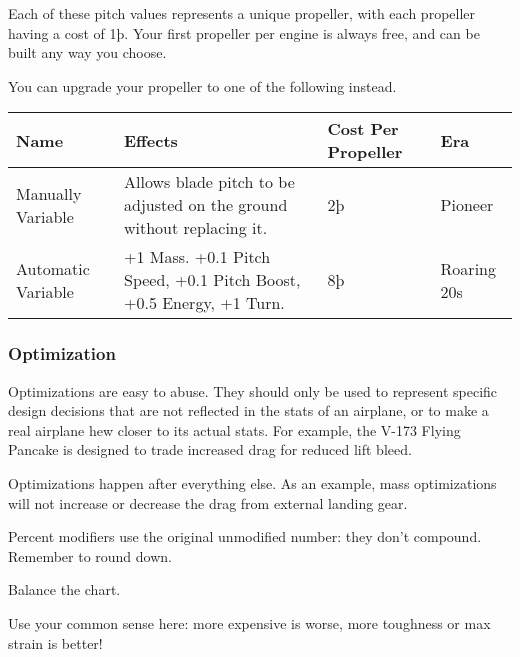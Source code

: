 \documentclass{article}
\begin{document}
Each of these pitch values represents a unique propeller, with
each propeller having a cost of 1þ. Your first propeller per engine is
always free, and can be built any way you choose.

You can upgrade your propeller to one of the following instead.

\begin{tabular}{|l|l|l|l|}
    \hline
    Name                  & Effects                                           & Cost Per Propeller & Era \\\hline
    Manually Variable     & Allows blade pitch to be adjusted on the ground
    without replacing it. & 2þ                                                & Pioneer                  \\\hline
    Automatic Variable    & +1 Mass. +0.1 Pitch Speed, +0.1 Pitch Boost, +0.5
    Energy, +1 Turn.      & 8þ                                                & Roaring 20s              \\\hline
\end{tabular}

\subsubsection{Optimization}
\label{_Optimization}

Optimizations are easy to abuse. They should only be used to represent
specific design decisions that are not reflected in the stats of an
airplane, or to make a real airplane hew closer to its actual stats. For
example, the V-173 Flying Pancake is designed to trade increased drag
for reduced lift bleed.

Optimizations happen after everything else. As an example, mass
optimizations will not increase or decrease the drag from external
landing gear.

Percent modifiers use the original unmodified number: they don't
compound. Remember to round down.

Balance the chart.

Use your common sense here: more expensive is worse, more toughness or
max strain is better!
\end{document}
